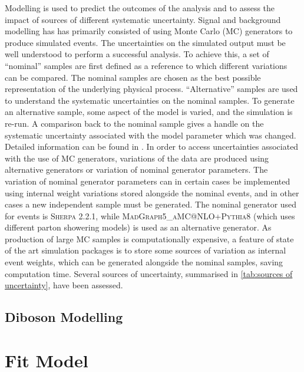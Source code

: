 Modelling is used to predict the outcomes of the analysis and to assess the impact of sources of different systematic uncertainty.
Signal and background modelling has has primarily consisted of using Monte Carlo (MC) generators to produce simulated events.
The uncertainties on the simulated output must be well understood to perform a successful analysis.
To achieve this, a set of ``nominal'' samples are first defined as a reference to which different variations can be compared.
The nominal samples are chosen as the best possible representation of the underlying physical process. ``Alternative'' samples are used to understand the systematic uncertainties on the nominal samples.
To generate an alternative sample, some aspect of the model is varied, and the simulation is re-run.
A comparison back to the nominal sample gives a handle on the systematic uncertainty associated with the model parameter which was changed.
Detailed information can be found in \cite{Bell:2316951}.
In order to access uncertainties associated with the use of MC generators, variations of the data are produced using alternative generators or variation of nominal generator parameters.
The variation of nominal generator parameters can in certain cases be implemented using internal weight variations stored alongside the nominal events, and in other cases a new independent sample must be generated. The nominal generator used for \Vjets events is \textsc{Sherpa 2.2.1}, while \textsc{MadGraph5\_aMC@NLO+Pythia8} (which uses different parton showering models) is used as an alternative generator.
As production of large MC samples is computationally expensive, a feature of state of the art simulation packages is to store some sources of variation as internal event weights, which can be generated alongside the nominal samples, saving computation time. Several sources of uncertainty, summarised in \cref{tab:sources of uncertainty}, have been assessed.

%

%

\subsection{Diboson Modelling}




\section{Fit Model}

